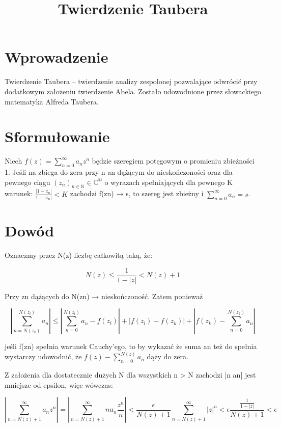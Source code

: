 \documentclass{article}
\begin{document}
\title{Twierdzenie Taubera}
\maketitle

\section*{Wprowadzenie}
Twierdzenie Taubera – twierdzenie analizy zespolonej pozwalające odwrócić przy dodatkowym założeniu twierdzenie Abela. Zostało udowodnione przez słowackiego matematyka Alfreda Taubera. 

\section*{Sformułowanie}

Niech \(f(z)=\sum _{n=0}^{\infty }a_{n}z^{n}\) będzie szeregiem potęgowym o promieniu zbieżności 1. Jeśli na zbiega do zera przy n an dążącym do nieskończoności oraz dla pewnego ciągu $(z_{n})_{n\in \mathbb {N} }\in \mathbb {C} ^{\mathbb {N} }$ o wyrazach spełniających dla pewnego K warunek: ${\frac {|1-z_{n}|}{1-|z_{n}|}}<K$ zachodzi f(zn) → s, to szereg jest zbieżny i \(\sum _{n=0}^{\infty }a_{n}=s\).

\section*{Dowód}
Oznaczmy przez N(z) liczbę całkowitą taką, że:

\begin{displaymath}
	N(z)\leq {\frac {1}{1-|z|}}<N(z)+1
\end{displaymath}

Przy zn dążących do N(zn) → nieskończoność. Zatem ponieważ

\begin{equation*}
	\left|\sum _{n=N(z_{k})}^{N(z_{l})}a_{n}\right|\leq \left|\sum _{n=0}^{N(z_{l})}a_{n}-f(z_{l})\right|+|f(z_{l})-f(z_{k})|+\left|f(z_{k})-\sum _{n=0}^{N(z_{k})}a_{n}\right|
\end{equation*}

jeśli f(zn) spełnia warunek Cauchy'ego, to by wykazać że suma an też do spełnia wystarczy udowodnić, że \(f(z)-\sum _{n=0}^{N(z)}a_{n}\) dąży do zera.

Z założenia dla dostatecznie dużych N dla wszystkich n > N zachodzi |n an| jest mniejsze od epsilon, więc wówczas: 

\[\left|\sum _{n=N(z)+1}^{\infty }a_{n}z^{n}\right|=\left|\sum _{n=N(z)+1}^{\infty }na_{n}{\frac {z^{n}}{n}}\right|<{\frac {\epsilon }{N(z)+1}}\sum _{n=N(z)+1}^{\infty }|z|^{n}<\epsilon {\frac {\frac {1}{1-|z|}}{N(z)+1}}<\epsilon\]
\end{document}
